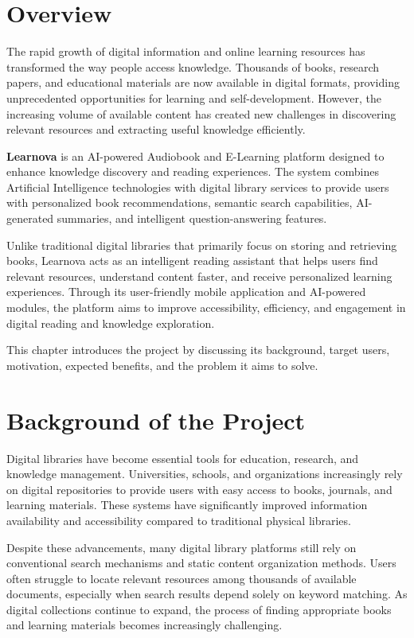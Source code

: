 \section{Overview}
\label{sec:overview}

The rapid growth of digital information and online learning resources has
transformed the way people access knowledge. Thousands of books, research
papers, and educational materials are now available in digital formats,
providing unprecedented opportunities for learning and self-development.
However, the increasing volume of available content has created new challenges
in discovering relevant resources and extracting useful knowledge efficiently.

\textbf{Learnova} is an AI-powered Audiobook and E-Learning platform designed
to enhance knowledge discovery and reading experiences. The system combines
Artificial Intelligence technologies with digital library services to provide
users with personalized book recommendations, semantic search capabilities,
AI-generated summaries, and intelligent question-answering features.

Unlike traditional digital libraries that primarily focus on storing and
retrieving books, Learnova acts as an intelligent reading assistant that helps
users find relevant resources, understand content faster, and receive
personalized learning experiences. Through its user-friendly mobile application
and AI-powered modules, the platform aims to improve accessibility, efficiency,
and engagement in digital reading and knowledge exploration.

This chapter introduces the project by discussing its background, target users,
motivation, expected benefits, and the problem it aims to solve.

\section{Background of the Project}
\label{sec:background}

Digital libraries have become essential tools for education, research, and
knowledge management. Universities, schools, and organizations increasingly
rely on digital repositories to provide users with easy access to books,
journals, and learning materials. These systems have significantly improved
information availability and accessibility compared to traditional physical
libraries.

Despite these advancements, many digital library platforms still rely on
conventional search mechanisms and static content organization methods. Users
often struggle to locate relevant resources among thousands of available
documents, especially when search results depend solely on keyword matching.
As digital collections continue to expand, the process of finding appropriate
books and learning materials becomes increasingly challenging.

